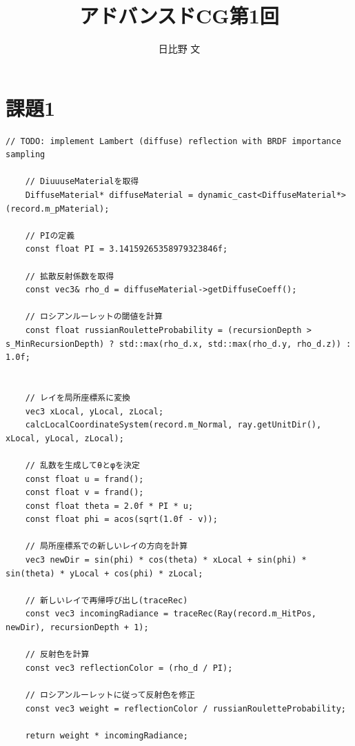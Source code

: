 \documentclass[dvipdfmx]{jsarticle}
\begin{document}
\title{アドバンスドCG第1回}
\author{日比野 文}
\maketitle

\section*{課題1}

\begin{lstlisting}[caption=Pathtracer]
		// TODO: implement Lambert (diffuse) reflection with BRDF importance sampling

    // DiuuuseMaterialを取得
    DiffuseMaterial* diffuseMaterial = dynamic_cast<DiffuseMaterial*>(record.m_pMaterial);

    // PIの定義
    const float PI = 3.14159265358979323846f;

    // 拡散反射係数を取得
    const vec3& rho_d = diffuseMaterial->getDiffuseCoeff();

    // ロシアンルーレットの閾値を計算
    const float russianRouletteProbability = (recursionDepth > s_MinRecursionDepth) ? std::max(rho_d.x, std::max(rho_d.y, rho_d.z)) : 1.0f;


    // レイを局所座標系に変換
    vec3 xLocal, yLocal, zLocal;
    calcLocalCoordinateSystem(record.m_Normal, ray.getUnitDir(), xLocal, yLocal, zLocal);

    // 乱数を生成してθとφを決定
    const float u = frand();
    const float v = frand();
    const float theta = 2.0f * PI * u;
    const float phi = acos(sqrt(1.0f - v));

    // 局所座標系での新しいレイの方向を計算
    vec3 newDir = sin(phi) * cos(theta) * xLocal + sin(phi) * sin(theta) * yLocal + cos(phi) * zLocal;

    // 新しいレイで再帰呼び出し(traceRec)
    const vec3 incomingRadiance = traceRec(Ray(record.m_HitPos, newDir), recursionDepth + 1);

    // 反射色を計算
    const vec3 reflectionColor = (rho_d / PI);

    // ロシアンルーレットに従って反射色を修正
    const vec3 weight = reflectionColor / russianRouletteProbability;

    return weight * incomingRadiance;
\end{lstlisting}
\end{document}
